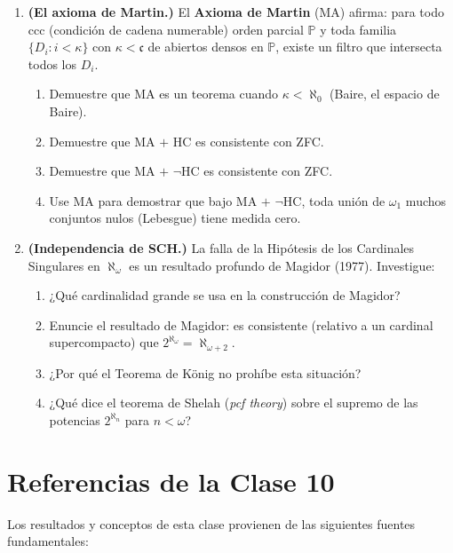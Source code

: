 \begin{enumerate}[leftmargin=2em, label=\textbf{P\arabic*$'$.}]
  \item \textbf{(El axioma de Martin.)} El \textbf{Axioma de Martin} ($\mathrm{MA}$) afirma: para todo ccc (condición de cadena numerable) orden parcial $\mathbb{P}$ y toda familia $\{D_i : i < \kappa\}$ con $\kappa < \mathfrak{c}$ de abiertos densos en $\mathbb{P}$, existe un filtro que intersecta todos los $D_i$.
  \begin{enumerate}[label=(\alph*)]
    \item Demuestre que MA es un teorema cuando $\kappa < \aleph_0$ (Baire, el espacio de Baire).
    \item Demuestre que MA $+$ HC es consistente con ZFC.
    \item Demuestre que MA $+$ $\neg$HC es consistente con ZFC.
    \item Use MA para demostrar que bajo MA $+$ $\neg$HC, toda unión de $\omega_1$ muchos conjuntos nulos (Lebesgue) tiene medida cero.
  \end{enumerate}

  \item \textbf{(Independencia de SCH.)} La falla de la Hipótesis de los Cardinales Singulares en $\aleph_\omega$ es un resultado profundo de Magidor (1977). Investigue:
  \begin{enumerate}[label=(\alph*)]
    \item ¿Qué cardinalidad grande se usa en la construcción de Magidor?
    \item Enuncie el resultado de Magidor: es consistente (relativo a un cardinal supercompacto) que $2^{\aleph_\omega} = \aleph_{\omega+2}$.
    \item ¿Por qué el Teorema de König no prohíbe esta situación?
    \item ¿Qué dice el teorema de Shelah (\textit{pcf theory}) sobre el supremo de las potencias $2^{\aleph_n}$ para $n < \omega$?
  \end{enumerate}

\end{enumerate}

\section*{Referencias de la Clase 10}

Los resultados y conceptos de esta clase provienen de las siguientes fuentes fundamentales:

